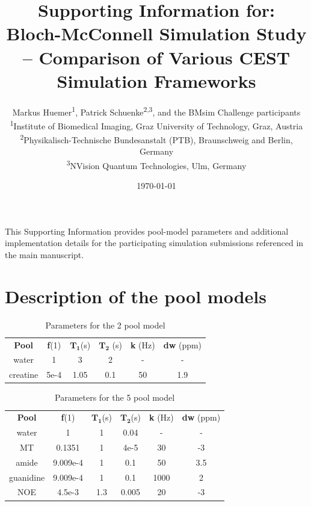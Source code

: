 \documentclass[11pt,a4paper]{article}
\newcommand{\affil}[1]{\textsuperscript{#1}}
\begin{document}
\title{Supporting Information for:\\[0.4em]
\large Bloch-McConnell Simulation Study -- Comparison of Various CEST Simulation Frameworks}

\author{\parbox{\textwidth}{\centering
Markus Huemer\affil{1},
Patrick Schuenke\affil{2,3},
and the BMsim Challenge participants
\\[1ex]
\small \affil{1}Institute of Biomedical Imaging, Graz University of Technology, Graz, Austria\\
\small \affil{2}Physikalisch-Technische Bundesanstalt (PTB), Braunschweig and Berlin, Germany\\
\small \affil{3}NVision Quantum Technologies, Ulm, Germany
}}

\date{\today}

\maketitle

This Supporting Information provides pool-model parameters and additional implementation details for the participating simulation submissions referenced in the main manuscript.

\section{Description of the pool models}\label{si:poolmodels}
\begin{table}[h]
\centering
\caption{Parameters for the 2 pool model}
\begin{tabular}{c|c|c|c|c|c}
\textbf{Pool} & \textbf{f}(1) & $\mathbf{T_1}$(s) & $\mathbf{T_2}$ (s) & \textbf{k} (Hz) & \textbf{dw} (ppm) \\
water & 1 & 3 & 2 & - & - \\
creatine & 5e-4 & 1.05 & 0.1 & 50 & 1.9
\end{tabular}%
\end{table}
\begin{table}[h]
\centering
\caption{Parameters for the 5 pool model}
\begin{tabular}{c|c|c|c|c|c}
\textbf{Pool} & \textbf{f}(1) & $\mathbf{T_1}$(s) & $\mathbf{T_2}$(s) & \textbf{k} (Hz) & \textbf{dw} (ppm) \\
water & 1 & 1 & 0.04 & - & - \\
MT & 0.1351 & 1 & 4e-5 & 30 & -3 \\
amide & 9.009e-4 & 1 & 0.1 & 50 & 3.5 \\
guanidine & 9.009e-4 & 1 & 0.1 & 1000 & 2 \\
NOE & 4.5e-3 & 1.3 & 0.005 & 20 & -3 \\

\end{tabular}%
\end{table}
\end{document}
